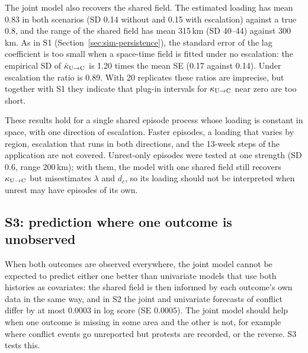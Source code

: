 The joint model also recovers the shared field. The estimated loading has mean 0.83
in both scenarios (SD 0.14 without and 0.15 with escalation) against a true 0.8, and the range of the shared field has
mean 315\,km (SD 40--44) against 300\,km. As in S1 (Section~\ref{sec:sim-persistence}), the standard error of the lag
coefficient is too small when a space-time field is fitted under no escalation: the
empirical SD of $\hat\kappa_{\mathrm{U}\to\mathrm{C}}$ is 1.20 times the mean SE (0.17 against 0.14). Under
escalation the ratio is 0.89. With 20 replicates these ratios are imprecise, but
together with S1 they indicate that plug-in intervals for $\kappa_{\mathrm{U}\to\mathrm{C}}$ near zero are too
short.


These results hold for a single shared episode process whose loading is constant in
space, with one direction of escalation. Faster episodes, a loading that varies by
region, escalation that runs in both directions, and the 13-week steps of the
application are not covered. Unrest-only episodes were tested at one strength (SD
0.6, range 200\,km); with them, the model with one shared field still recovers
$\kappa_{\mathrm{U}\to\mathrm{C}}$ but misestimates $\lambda$ and $d_c$, so its loading should not be
interpreted when unrest may have episodes of its own.

\subsection{S3: prediction where one outcome is unobserved}\label{sec:sim-holdout}

When both outcomes are observed everywhere, the joint model cannot be expected to
predict either one better than univariate models that use both histories as
covariates: the shared field is then informed by each outcome's own data in the same
way, and in S2 the joint and univariate forecasts of conflict differ by at most
$0.0003$ in log score (SE $0.0005$). The joint model should help when one outcome is
missing in some area and the other is not, for example where conflict events go
unreported but protests are recorded, or the reverse. S3 tests this.

